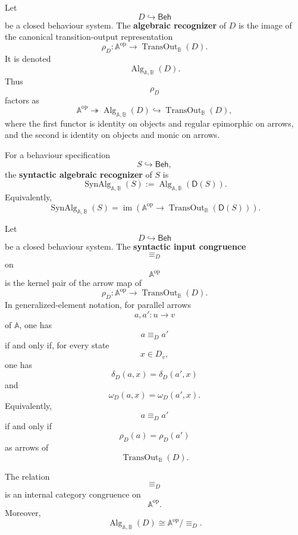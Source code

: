 \begin{definition}
\label{def:reiterman-alg-D}
Let
\[
D\hookrightarrow\mathsf{Beh}
\]
be a closed behaviour system. The \textbf{algebraic recognizer} of \(D\) is
the image of the canonical transition-output representation
\[
\rho_D:
\mathbb A^{\mathrm{op}}
\to
\operatorname{TransOut}_{\mathbb B}(D).
\]
It is denoted
\[
\operatorname{Alg}_{\mathbb A,\mathbb B}(D).
\]
Thus
\[
\rho_D
\]
factors as
\[
\mathbb A^{\mathrm{op}}
\twoheadrightarrow
\operatorname{Alg}_{\mathbb A,\mathbb B}(D)
\hookrightarrow
\operatorname{TransOut}_{\mathbb B}(D),
\]
where the first functor is identity on objects and regular epimorphic on
arrows, and the second is identity on objects and monic on arrows.
\end{definition}

\begin{definition}
\label{def:reiterman-synalg}
For a behaviour specification
\[
S\hookrightarrow\mathsf{Beh},
\]
the \textbf{syntactic algebraic recognizer} of \(S\) is
\[
\operatorname{SynAlg}_{\mathbb A,\mathbb B}(S)
:=
\operatorname{Alg}_{\mathbb A,\mathbb B}(\mathsf D(S)).
\]
Equivalently,
\[
\operatorname{SynAlg}_{\mathbb A,\mathbb B}(S)
=
\operatorname{im}
\left(
\mathbb A^{\mathrm{op}}
\to
\operatorname{TransOut}_{\mathbb B}(\mathsf D(S))
\right).
\]
\end{definition}

\begin{definition}
\label{def:reiterman-syntactic-input-congruence}
Let
\[
D\hookrightarrow\mathsf{Beh}
\]
be a closed behaviour system. The \textbf{syntactic input congruence}
\[
{\equiv_D}
\]
on
\[
\mathbb A^{\mathrm{op}}
\]
is the kernel pair of the arrow map of
\[
\rho_D:
\mathbb A^{\mathrm{op}}
\to
\operatorname{TransOut}_{\mathbb B}(D).
\]
In generalized-element notation, for parallel arrows
\[
a,a':u\to v
\]
of \(\mathbb A\), one has
\[
a\equiv_D a'
\]
if and only if, for every state
\[
x\in D_v,
\]
one has
\[
\delta_D(a,x)=\delta_D(a',x)
\]
and
\[
\omega_D(a,x)=\omega_D(a',x).
\]
Equivalently,
\[
a\equiv_D a'
\]
if and only if
\[
\rho_D(a)=\rho_D(a')
\]
as arrows of
\[
\operatorname{TransOut}_{\mathbb B}(D).
\]
\end{definition}

\begin{proposition}
\label{prop:reiterman-syntactic-input-congruence}
The relation
\[
{\equiv_D}
\]
is an internal category congruence on
\[
\mathbb A^{\mathrm{op}}.
\]
Moreover,
\[
\operatorname{Alg}_{\mathbb A,\mathbb B}(D)
\cong
\mathbb A^{\mathrm{op}}/{\equiv_D}.
\]
\end{proposition}

